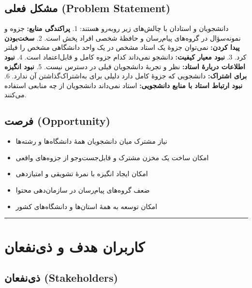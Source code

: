 \documentclass[12pt, a4paper]{article}
\begin{document}
\subsection{مشکل فعلی (Problem Statement)}

دانشجویان و استادان با چالش‌های زیر روبه‌رو هستند:
1. \textbf{پراکندگی منابع:} جزوه و نمونه‌سؤال در گروه‌های پیام‌رسان و حافظهٔ شخصی افراد پخش است.
2. \textbf{سخت‌بودن پیدا کردن:} نمی‌توان جزوهٔ یک استاد مشخص در یک واحد دانشگاهی مشخص را فیلتر کرد.
3. \textbf{نبود معیار کیفیت:} دانشجو نمی‌داند کدام جزوه کامل و قابل‌اعتماد است.
4. \textbf{نبود اطلاعات دربارهٔ استاد:} نظر و تجربهٔ دانشجویان قبلی در دسترس نیست.
5. \textbf{نبود انگیزه برای اشتراک:} دانشجویی که جزوهٔ کامل دارد دلیلی برای به‌اشتراک‌گذاشتن آن ندارد.
6. \textbf{نبود ارتباط استاد با منابع دانشجویی:} استاد نمی‌داند دانشجویان از چه منابعی استفاده می‌کنند.

\subsection{فرصت (Opportunity)}

\begin{itemize}
\tightlist
\item
  نیاز مشترک میان دانشجویان همهٔ دانشگاه‌ها و رشته‌ها
\item
  امکان ساخت یک مخزن مشترک و قابل‌جست‌وجو از جزوه‌های واقعی
\item
  امکان ایجاد انگیزه با نمرهٔ تشویقی و امتیازدهی
\item
  ضعف گروه‌های پیام‌رسان در سازمان‌دهی محتوا
\item
  امکان توسعه به همهٔ استان‌ها و دانشگاه‌های کشور
\end{itemize}

\begin{center}\rule{0.5\linewidth}{0.5pt}\end{center}

\section{کاربران هدف و ذی‌نفعان}

\subsection{ذی‌نفعان (Stakeholders)}
\end{document}
